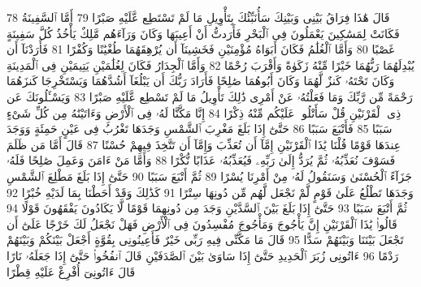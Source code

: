 {\tiny\colorbox{cl_aya}{78}} قَالَ هَٰذَا فِرَاقُ بَيْنِى وَبَيْنِكَ سَأُنَبِّئُكَ بِتَأْوِيلِ مَا لَمْ تَسْتَطِع عَّلَيْهِ صَبْرًا
{\tiny\colorbox{cl_aya}{79}} أَمَّا ٱلسَّفِينَةُ فَكَانَتْ لِمَسَٰكِينَ يَعْمَلُونَ فِى ٱلْبَحْرِ فَأَرَدتُّ أَنْ أَعِيبَهَا وَكَانَ وَرَآءَهُم مَّلِكٌ يَأْخُذُ كُلَّ سَفِينَةٍ غَصْبًا
{\tiny\colorbox{cl_aya}{80}} وَأَمَّا ٱلْغُلَٰمُ فَكَانَ أَبَوَاهُ مُؤْمِنَيْنِ فَخَشِينَآ أَن يُرْهِقَهُمَا طُغْيَٰنًا وَكُفْرًا
{\tiny\colorbox{cl_aya}{81}} فَأَرَدْنَآ أَن يُبْدِلَهُمَا رَبُّهُمَا خَيْرًا مِّنْهُ زَكَوٰةً وَأَقْرَبَ رُحْمًا
{\tiny\colorbox{cl_aya}{82}} وَأَمَّا ٱلْجِدَارُ فَكَانَ لِغُلَٰمَيْنِ يَتِيمَيْنِ فِى ٱلْمَدِينَةِ وَكَانَ تَحْتَهُۥ كَنزٌ لَّهُمَا وَكَانَ أَبُوهُمَا صَٰلِحًا فَأَرَادَ رَبُّكَ أَن يَبْلُغَآ أَشُدَّهُمَا وَيَسْتَخْرِجَا كَنزَهُمَا رَحْمَةً مِّن رَّبِّكَ وَمَا فَعَلْتُهُۥ عَنْ أَمْرِى ذَٰلِكَ تَأْوِيلُ مَا لَمْ تَسْطِع عَّلَيْهِ صَبْرًا
{\tiny\colorbox{cl_aya}{83}} وَيَسْـَٔلُونَكَ عَن ذِى ٱلْقَرْنَيْنِ قُلْ سَأَتْلُوا۟ عَلَيْكُم مِّنْهُ ذِكْرًا
{\tiny\colorbox{cl_aya}{84}} إِنَّا مَكَّنَّا لَهُۥ فِى ٱلْأَرْضِ وَءَاتَيْنَٰهُ مِن كُلِّ شَىْءٍ سَبَبًا
{\tiny\colorbox{cl_aya}{85}} فَأَتْبَعَ سَبَبًا
{\tiny\colorbox{cl_aya}{86}} حَتَّىٰٓ إِذَا بَلَغَ مَغْرِبَ ٱلشَّمْسِ وَجَدَهَا تَغْرُبُ فِى عَيْنٍ حَمِئَةٍ وَوَجَدَ عِندَهَا قَوْمًا قُلْنَا يَٰذَا ٱلْقَرْنَيْنِ إِمَّآ أَن تُعَذِّبَ وَإِمَّآ أَن تَتَّخِذَ فِيهِمْ حُسْنًا
{\tiny\colorbox{cl_aya}{87}} قَالَ أَمَّا مَن ظَلَمَ فَسَوْفَ نُعَذِّبُهُۥ ثُمَّ يُرَدُّ إِلَىٰ رَبِّهِۦ فَيُعَذِّبُهُۥ عَذَابًا نُّكْرًا
{\tiny\colorbox{cl_aya}{88}} وَأَمَّا مَنْ ءَامَنَ وَعَمِلَ صَٰلِحًا فَلَهُۥ جَزَآءً ٱلْحُسْنَىٰ وَسَنَقُولُ لَهُۥ مِنْ أَمْرِنَا يُسْرًا
{\tiny\colorbox{cl_aya}{89}} ثُمَّ أَتْبَعَ سَبَبًا
{\tiny\colorbox{cl_aya}{90}} حَتَّىٰٓ إِذَا بَلَغَ مَطْلِعَ ٱلشَّمْسِ وَجَدَهَا تَطْلُعُ عَلَىٰ قَوْمٍ لَّمْ نَجْعَل لَّهُم مِّن دُونِهَا سِتْرًا
{\tiny\colorbox{cl_aya}{91}} كَذَٰلِكَ وَقَدْ أَحَطْنَا بِمَا لَدَيْهِ خُبْرًا
{\tiny\colorbox{cl_aya}{92}} ثُمَّ أَتْبَعَ سَبَبًا
{\tiny\colorbox{cl_aya}{93}} حَتَّىٰٓ إِذَا بَلَغَ بَيْنَ ٱلسَّدَّيْنِ وَجَدَ مِن دُونِهِمَا قَوْمًا لَّا يَكَادُونَ يَفْقَهُونَ قَوْلًا
{\tiny\colorbox{cl_aya}{94}} قَالُوا۟ يَٰذَا ٱلْقَرْنَيْنِ إِنَّ يَأْجُوجَ وَمَأْجُوجَ مُفْسِدُونَ فِى ٱلْأَرْضِ فَهَلْ نَجْعَلُ لَكَ خَرْجًا عَلَىٰٓ أَن تَجْعَلَ بَيْنَنَا وَبَيْنَهُمْ سَدًّا
{\tiny\colorbox{cl_aya}{95}} قَالَ مَا مَكَّنِّى فِيهِ رَبِّى خَيْرٌ فَأَعِينُونِى بِقُوَّةٍ أَجْعَلْ بَيْنَكُمْ وَبَيْنَهُمْ رَدْمًا
{\tiny\colorbox{cl_aya}{96}} ءَاتُونِى زُبَرَ ٱلْحَدِيدِ حَتَّىٰٓ إِذَا سَاوَىٰ بَيْنَ ٱلصَّدَفَيْنِ قَالَ ٱنفُخُوا۟ حَتَّىٰٓ إِذَا جَعَلَهُۥ نَارًا قَالَ ءَاتُونِىٓ أُفْرِغْ عَلَيْهِ قِطْرًا
